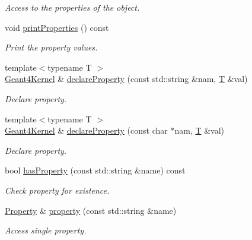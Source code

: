 \begin{DoxyCompactItemize}
\begin{DoxyCompactList}\small\item\em Access to the properties of the object. \end{DoxyCompactList}\item 
void \hyperlink{class_d_d4hep_1_1_simulation_1_1_geant4_kernel_a3a4988323078c97accc89fcc5e5f5750}{print\+Properties} () const
\begin{DoxyCompactList}\small\item\em Print the property values. \end{DoxyCompactList}\item 
{\footnotesize template$<$typename T $>$ }\\\hyperlink{class_d_d4hep_1_1_simulation_1_1_geant4_kernel}{Geant4\+Kernel} \& \hyperlink{class_d_d4hep_1_1_simulation_1_1_geant4_kernel_ac267696721115fda0d13cc9a4337214e}{declare\+Property} (const std\+::string \&nam, \hyperlink{class_t}{T} \&val)
\begin{DoxyCompactList}\small\item\em Declare property. \end{DoxyCompactList}\item 
{\footnotesize template$<$typename T $>$ }\\\hyperlink{class_d_d4hep_1_1_simulation_1_1_geant4_kernel}{Geant4\+Kernel} \& \hyperlink{class_d_d4hep_1_1_simulation_1_1_geant4_kernel_a7729a86ca944cc34f9e42447650905f1}{declare\+Property} (const char $\ast$nam, \hyperlink{class_t}{T} \&val)
\begin{DoxyCompactList}\small\item\em Declare property. \end{DoxyCompactList}\item 
bool \hyperlink{class_d_d4hep_1_1_simulation_1_1_geant4_kernel_af867ef6ab82942e84625c5ebb9a06c3c}{has\+Property} (const std\+::string \&name) const
\begin{DoxyCompactList}\small\item\em Check property for existence. \end{DoxyCompactList}\item 
\hyperlink{class_d_d4hep_1_1_property}{Property} \& \hyperlink{class_d_d4hep_1_1_simulation_1_1_geant4_kernel_a51c2d757b81b0c8ee31be77515d4d622}{property} (const std\+::string \&name)
\begin{DoxyCompactList}\small\item\em Access single property. \end{DoxyCompactList}\item 

\end{DoxyCompactItemize}
